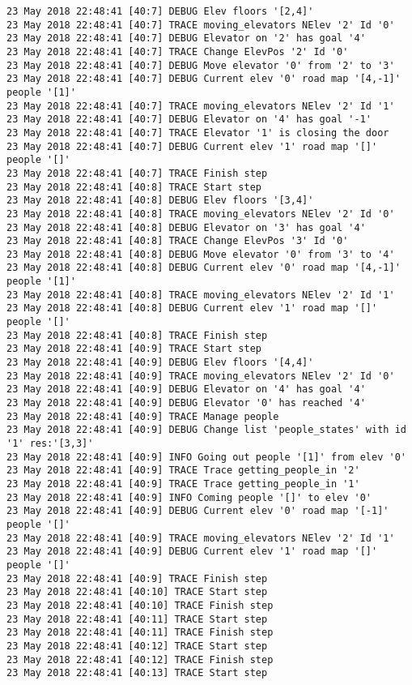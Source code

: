 \begin{lstlisting}[basicstyle=\scriptsize]
23 May 2018 22:48:41 [40:7] DEBUG Elev floors '[2,4]'
23 May 2018 22:48:41 [40:7] TRACE moving_elevators NElev '2' Id '0'
23 May 2018 22:48:41 [40:7] DEBUG Elevator on '2' has goal '4'
23 May 2018 22:48:41 [40:7] TRACE Change ElevPos '2' Id '0'
23 May 2018 22:48:41 [40:7] DEBUG Move elevator '0' from '2' to '3'
23 May 2018 22:48:41 [40:7] DEBUG Current elev '0' road map '[4,-1]' people '[1]'
23 May 2018 22:48:41 [40:7] TRACE moving_elevators NElev '2' Id '1'
23 May 2018 22:48:41 [40:7] DEBUG Elevator on '4' has goal '-1'
23 May 2018 22:48:41 [40:7] TRACE Elevator '1' is closing the door
23 May 2018 22:48:41 [40:7] DEBUG Current elev '1' road map '[]' people '[]'
23 May 2018 22:48:41 [40:7] TRACE Finish step
23 May 2018 22:48:41 [40:8] TRACE Start step
23 May 2018 22:48:41 [40:8] DEBUG Elev floors '[3,4]'
23 May 2018 22:48:41 [40:8] TRACE moving_elevators NElev '2' Id '0'
23 May 2018 22:48:41 [40:8] DEBUG Elevator on '3' has goal '4'
23 May 2018 22:48:41 [40:8] TRACE Change ElevPos '3' Id '0'
23 May 2018 22:48:41 [40:8] DEBUG Move elevator '0' from '3' to '4'
23 May 2018 22:48:41 [40:8] DEBUG Current elev '0' road map '[4,-1]' people '[1]'
23 May 2018 22:48:41 [40:8] TRACE moving_elevators NElev '2' Id '1'
23 May 2018 22:48:41 [40:8] DEBUG Current elev '1' road map '[]' people '[]'
23 May 2018 22:48:41 [40:8] TRACE Finish step
23 May 2018 22:48:41 [40:9] TRACE Start step
23 May 2018 22:48:41 [40:9] DEBUG Elev floors '[4,4]'
23 May 2018 22:48:41 [40:9] TRACE moving_elevators NElev '2' Id '0'
23 May 2018 22:48:41 [40:9] DEBUG Elevator on '4' has goal '4'
23 May 2018 22:48:41 [40:9] DEBUG Elevator '0' has reached '4'
23 May 2018 22:48:41 [40:9] TRACE Manage people
23 May 2018 22:48:41 [40:9] DEBUG Change list 'people_states' with id '1' res:'[3,3]'
23 May 2018 22:48:41 [40:9] INFO Going out people '[1]' from elev '0'
23 May 2018 22:48:41 [40:9] TRACE Trace getting_people_in '2'
23 May 2018 22:48:41 [40:9] TRACE Trace getting_people_in '1'
23 May 2018 22:48:41 [40:9] INFO Coming people '[]' to elev '0'
23 May 2018 22:48:41 [40:9] DEBUG Current elev '0' road map '[-1]' people '[]'
23 May 2018 22:48:41 [40:9] TRACE moving_elevators NElev '2' Id '1'
23 May 2018 22:48:41 [40:9] DEBUG Current elev '1' road map '[]' people '[]'
23 May 2018 22:48:41 [40:9] TRACE Finish step
23 May 2018 22:48:41 [40:10] TRACE Start step
23 May 2018 22:48:41 [40:10] TRACE Finish step
23 May 2018 22:48:41 [40:11] TRACE Start step
23 May 2018 22:48:41 [40:11] TRACE Finish step
23 May 2018 22:48:41 [40:12] TRACE Start step
23 May 2018 22:48:41 [40:12] TRACE Finish step
23 May 2018 22:48:41 [40:13] TRACE Start step

\end{lstlisting}
